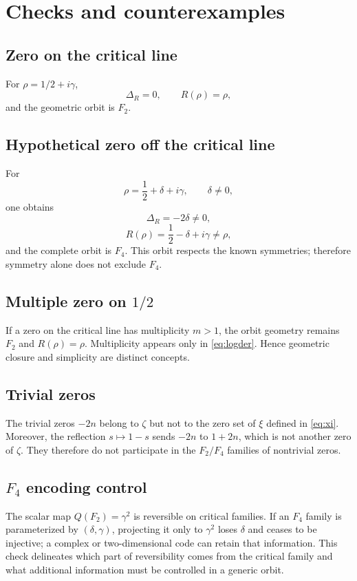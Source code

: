 \documentclass[11pt]{amsart}
\theoremstyle{definition}
\theoremstyle{remark}
\begin{document}
\section{Checks and counterexamples}
\subsection{Zero on the critical line}
For $\rho=1/2+i\gamma$,
\[
\Delta_R=0,\qquad R(\rho)=\rho,
\]
and the geometric orbit is $F_2$.

\subsection{Hypothetical zero off the critical line}
For
\begin{equation}
 \rho=\frac12+\delta+i\gamma,\qquad\delta\neq0,
\end{equation}
one obtains
\begin{equation}
 \Delta_R=-2\delta\neq0,
\end{equation}
\begin{equation}
 R(\rho)=\frac12-\delta+i\gamma\neq\rho,
\end{equation}
and the complete orbit is $F_4$. This orbit respects the known symmetries; therefore symmetry alone does not exclude $F_4$.

\subsection{Multiple zero on $1/2$}
If a zero on the critical line has multiplicity $m>1$, the orbit geometry remains $F_2$ and $R(\rho)=\rho$. Multiplicity appears only in \eqref{eq:logder}. Hence geometric closure and simplicity are distinct concepts.

\subsection{Trivial zeros}
The trivial zeros $-2n$ belong to $\zeta$ but not to the zero set of $\xi$ defined in \eqref{eq:xi}. Moreover, the reflection $s\mapsto1-s$ sends $-2n$ to $1+2n$, which is not another zero of $\zeta$. They therefore do not participate in the $F_2/F_4$ families of nontrivial zeros.

\subsection{$F_4$ encoding control}
The scalar map $Q(F_2)=\gamma^2$ is reversible on critical families. If an $F_4$ family is parameterized by $(\delta,\gamma)$, projecting it only to $\gamma^2$ loses $\delta$ and ceases to be injective; a complex or two-dimensional code can retain that information. This check delineates which part of reversibility comes from the critical family and what additional information must be controlled in a generic orbit.
\end{document}

